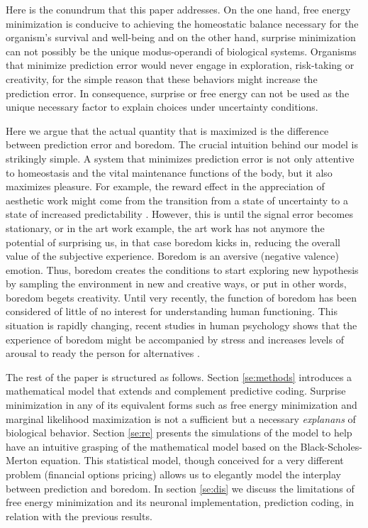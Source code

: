 \documentclass[11pt, onecolumn]{article}
\begin{document}
Here is the conundrum that this paper addresses. On the one hand, free energy minimization is conducive to achieving the homeostatic balance necessary for the organism's survival and well-being and on the other hand, surprise minimization can not possibly be the unique modus-operandi of biological systems. Organisms that minimize prediction error would never engage in exploration, risk-taking or creativity, for the simple reason that these behaviors might increase the prediction error. 
In consequence, surprise or free energy can not be used as the unique necessary factor to explain choices under uncertainty conditions. 

Here we argue that the actual quantity that is maximized is the difference between prediction error and boredom. 
The crucial intuition behind our model is strikingly simple.
A system that minimizes prediction error is not only attentive to homeostasis and the vital maintenance functions of the body, but it also maximizes pleasure. For example, the reward effect in the appreciation of aesthetic work might come from the transition from a state of uncertainty to a state of increased predictability \citep{van_de_cruys_putting_2011}.
However, this is until the signal error becomes stationary, or in the art work example, the art work has not anymore the potential of surprising us, in that case boredom kicks in, reducing the overall value of the subjective experience.
Boredom is an aversive (negative valence) emotion. Thus, boredom creates the conditions to start exploring new hypothesis by sampling the environment in new and creative ways, or put in other words, boredom begets creativity. 
Until very recently, the function of boredom has been considered of little of no interest for understanding human functioning. This situation is rapidly changing, 
recent studies in human psychology shows that the experience of boredom might be accompanied by stress and increases levels of arousal to ready the person for alternatives \citep{posner_neurophysiological_2009} \citep{bench_function_2013}. 


The rest of the paper is structured as follows. Section \ref{se:methods} introduces a mathematical model that extends and complement predictive coding. Surprise minimization in any of its equivalent forms such as free energy minimization and marginal likelihood maximization is not a sufficient but a necessary \emph{explanans} of biological behavior. Section \ref{se:re} presents the simulations of the model to help have an intuitive grasping of the mathematical model based on the Black-Scholes-Merton equation. This statistical model, though conceived for a very different problem (financial options pricing) allows us to elegantly model the interplay between prediction and boredom.
In section \ref{se:dis} we discuss the limitations of free energy minimization and its neuronal implementation, prediction coding, in relation with the previous results.
\end{document}
